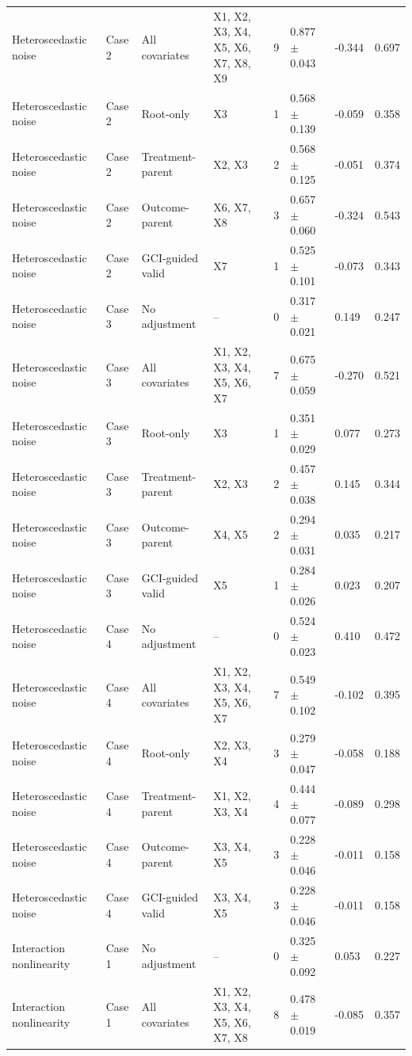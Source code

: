 \begin{tabular}{llllrlll}
Heteroscedastic noise & Case 2 & All covariates & X1, X2, X3, X4, X5, X6, X7, X8, X9 & 9 & 0.877 $\pm$ 0.043 & -0.344 & 0.697 \\
Heteroscedastic noise & Case 2 & Root-only & X3 & 1 & 0.568 $\pm$ 0.139 & -0.059 & 0.358 \\
Heteroscedastic noise & Case 2 & Treatment-parent & X2, X3 & 2 & 0.568 $\pm$ 0.125 & -0.051 & 0.374 \\
Heteroscedastic noise & Case 2 & Outcome-parent & X6, X7, X8 & 3 & 0.657 $\pm$ 0.060 & -0.324 & 0.543 \\
Heteroscedastic noise & Case 2 & GCI-guided valid & X7 & 1 & 0.525 $\pm$ 0.101 & -0.073 & 0.343 \\
Heteroscedastic noise & Case 3 & No adjustment & -- & 0 & 0.317 $\pm$ 0.021 & 0.149 & 0.247 \\
Heteroscedastic noise & Case 3 & All covariates & X1, X2, X3, X4, X5, X6, X7 & 7 & 0.675 $\pm$ 0.059 & -0.270 & 0.521 \\
Heteroscedastic noise & Case 3 & Root-only & X3 & 1 & 0.351 $\pm$ 0.029 & 0.077 & 0.273 \\
Heteroscedastic noise & Case 3 & Treatment-parent & X2, X3 & 2 & 0.457 $\pm$ 0.038 & 0.145 & 0.344 \\
Heteroscedastic noise & Case 3 & Outcome-parent & X4, X5 & 2 & 0.294 $\pm$ 0.031 & 0.035 & 0.217 \\
Heteroscedastic noise & Case 3 & GCI-guided valid & X5 & 1 & 0.284 $\pm$ 0.026 & 0.023 & 0.207 \\
Heteroscedastic noise & Case 4 & No adjustment & -- & 0 & 0.524 $\pm$ 0.023 & 0.410 & 0.472 \\
Heteroscedastic noise & Case 4 & All covariates & X1, X2, X3, X4, X5, X6, X7 & 7 & 0.549 $\pm$ 0.102 & -0.102 & 0.395 \\
Heteroscedastic noise & Case 4 & Root-only & X2, X3, X4 & 3 & 0.279 $\pm$ 0.047 & -0.058 & 0.188 \\
Heteroscedastic noise & Case 4 & Treatment-parent & X1, X2, X3, X4 & 4 & 0.444 $\pm$ 0.077 & -0.089 & 0.298 \\
Heteroscedastic noise & Case 4 & Outcome-parent & X3, X4, X5 & 3 & 0.228 $\pm$ 0.046 & -0.011 & 0.158 \\
Heteroscedastic noise & Case 4 & GCI-guided valid & X3, X4, X5 & 3 & 0.228 $\pm$ 0.046 & -0.011 & 0.158 \\
Interaction nonlinearity & Case 1 & No adjustment & -- & 0 & 0.325 $\pm$ 0.092 & 0.053 & 0.227 \\
Interaction nonlinearity & Case 1 & All covariates & X1, X2, X3, X4, X5, X6, X7, X8 & 8 & 0.478 $\pm$ 0.019 & -0.085 & 0.357 \\

\end{tabular}
